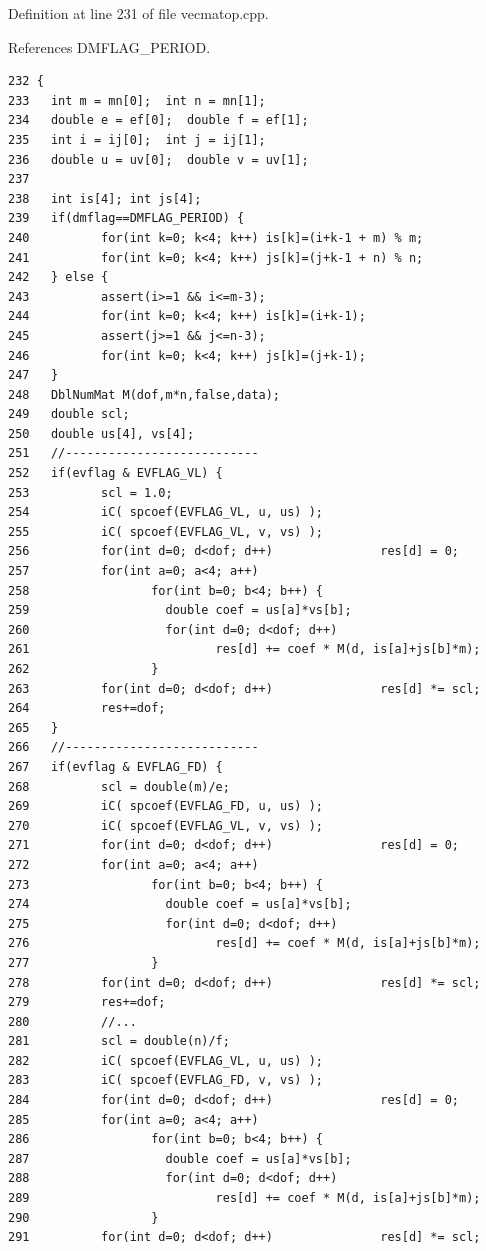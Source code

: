 Definition at line 231 of file vecmatop.cpp.

References DMFLAG\_\-PERIOD.

\footnotesize\begin{verbatim}232 {
233   int m = mn[0];  int n = mn[1];
234   double e = ef[0];  double f = ef[1];
235   int i = ij[0];  int j = ij[1];
236   double u = uv[0];  double v = uv[1];
237   
238   int is[4]; int js[4];
239   if(dmflag==DMFLAG_PERIOD) {
240          for(int k=0; k<4; k++) is[k]=(i+k-1 + m) % m;
241          for(int k=0; k<4; k++) js[k]=(j+k-1 + n) % n;
242   } else {
243          assert(i>=1 && i<=m-3);
244          for(int k=0; k<4; k++) is[k]=(i+k-1);
245          assert(j>=1 && j<=n-3);
246          for(int k=0; k<4; k++) js[k]=(j+k-1);
247   }
248   DblNumMat M(dof,m*n,false,data);
249   double scl;
250   double us[4], vs[4];
251   //---------------------------
252   if(evflag & EVFLAG_VL) {
253          scl = 1.0;
254          iC( spcoef(EVFLAG_VL, u, us) );
255          iC( spcoef(EVFLAG_VL, v, vs) );
256          for(int d=0; d<dof; d++)               res[d] = 0;
257          for(int a=0; a<4; a++)
258                 for(int b=0; b<4; b++) {
259                   double coef = us[a]*vs[b]; 
260                   for(int d=0; d<dof; d++)
261                          res[d] += coef * M(d, is[a]+js[b]*m);
262                 }
263          for(int d=0; d<dof; d++)               res[d] *= scl;
264          res+=dof;
265   }
266   //---------------------------
267   if(evflag & EVFLAG_FD) {
268          scl = double(m)/e;
269          iC( spcoef(EVFLAG_FD, u, us) );
270          iC( spcoef(EVFLAG_VL, v, vs) );
271          for(int d=0; d<dof; d++)               res[d] = 0;
272          for(int a=0; a<4; a++)
273                 for(int b=0; b<4; b++) {
274                   double coef = us[a]*vs[b];
275                   for(int d=0; d<dof; d++)
276                          res[d] += coef * M(d, is[a]+js[b]*m);
277                 }
278          for(int d=0; d<dof; d++)               res[d] *= scl;
279          res+=dof;
280          //...
281          scl = double(n)/f;
282          iC( spcoef(EVFLAG_VL, u, us) );
283          iC( spcoef(EVFLAG_FD, v, vs) );
284          for(int d=0; d<dof; d++)               res[d] = 0;
285          for(int a=0; a<4; a++)
286                 for(int b=0; b<4; b++) {
287                   double coef = us[a]*vs[b]; 
288                   for(int d=0; d<dof; d++)
289                          res[d] += coef * M(d, is[a]+js[b]*m);
290                 }
291          for(int d=0; d<dof; d++)               res[d] *= scl;

\end{verbatim}
